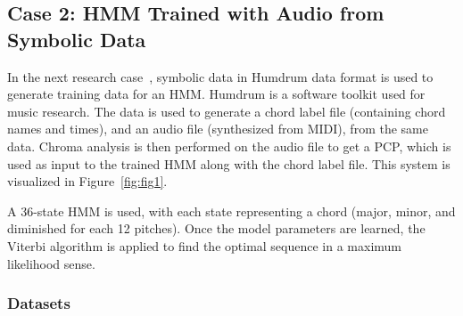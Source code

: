 \documentclass{sig-alternate}
\begin{document}
\subsection{Case 2: HMM Trained with Audio from Symbolic Data}

In the next research case~\cite{Lee:2006}, symbolic data in Humdrum data format is used to generate training data for an HMM. Humdrum is a software toolkit used for music research. The data is used to generate a chord label file (containing chord names and times), and an audio file (synthesized from MIDI), from the same data. Chroma analysis is then performed on the audio file to get a PCP, which is used as input to the trained HMM along with the chord label file. This system is visualized in Figure~\ref{fig:fig1}.

A 36-state HMM is used, with each state representing a chord (major, minor, and diminished for each 12 pitches). Once the model parameters are learned, the Viterbi algorithm is applied to find the optimal sequence in a maximum likelihood sense. 






\subsubsection{Datasets}
\end{document}
